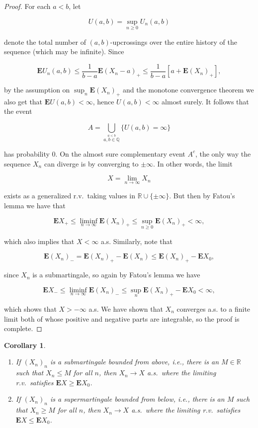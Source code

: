\documentclass[11pt]{report}
\newcommand{\R}{\mathbb{R}}
\theoremstyle{plain}
\newtheorem{cor}[thm]{Corollary}
\theoremstyle{definition}
\begin{document}
\begin{proof}
For each $a<b$, let

\[
U(a,b) = \sup_{n\ge0} U_n(a,b)
\]

\noindent denote the total number of $(a,b)$-upcrossings over
the entire history of the sequence (which may be
infinite). Since

\[
\mathbf{E} U_n(a,b) \le \frac{1}{b-a} \mathbf{E}(X_n-a)_+ \le \frac{1}{b-a} \left[ a + \mathbf{E} (X_n)_+ \right],
\]

\noindent by the assumption on $\sup_n \mathbf{E}(X_n)_+$ and
the monotone convergence theorem we also get that
$\mathbf{E} U(a,b) < \infty$, hence $U(a,b)<\infty$
almost surely. It follows that the event

\[
A = \bigcup_{\stackrel{a<b}{a,b\in\mathbb{Q}}} \{ U(a,b) = \infty \}
\]

\noindent has probability $0$. On the almost sure complementary
event $A^c$, the only way the sequence $X_n$ can
diverge is by converging to $\pm \infty$. In other
words, the limit

\[
X = \lim_{n\to\infty} X_n
\]

\noindent exists as a generalized r.v.\ taking values in
$\R\cup\{\pm\infty\}$. But then by Fatou's lemma we
have that

\[
\mathbf{E} X_+ \le \liminf_{n\to\infty} \mathbf{E} (X_n)_+ \le \sup_{n\ge 0} \mathbf{E}(X_n)_+ < \infty,
\]

\noindent which also implies that $X<\infty$ a.s. Similarly,
note that

\[
\mathbf{E} (X_n)_- = \mathbf{E} (X_n)_+ - \mathbf{E}(X_n) \le \mathbf{E} (X_n)_+ - \mathbf{E} X_0,
\]

\noindent since $X_n$ is a submartingale, so again by Fatou's
lemma we have

\[
\mathbf{E} X_- \le \liminf_{n\to\infty} \mathbf{E} (X_n)_- \le \sup_n \mathbf{E}(X_n)_+ - \mathbf{E} X_0 < \infty,
\]

\noindent which shows that $X>-\infty$ a.s. We have shown that
$X_n$ converges a.s. to a finite limit both of whose
positive and negative parts are integrable, so the
proof is complete.
\end{proof}

\begin{cor}
\label{mart-conv-cor}

\begin{enumerate}[label=\arabic*.]
\item If $(X_n)_n$ is a submartingale bounded from above,
i.e., there is an $M\in\R$ such that $X_n\le M$ for
all $n$, then $X_n\to X$ a.s.\ where the limiting
r.v.\ satisfies $\mathbf{E} X \ge \mathbf{E} X_0$.

\item If $(X_n)_n$ is a supermartingale bounded from below,
i.e., there is an $M$ such that $X_n\ge M$ for all
$n$, then $X_n\to X$ a.s.\ where the limiting r.v.\
satisfies $\mathbf{E} X \le \mathbf{E} X_0$.
\end{enumerate}

\end{cor}
\end{document}
